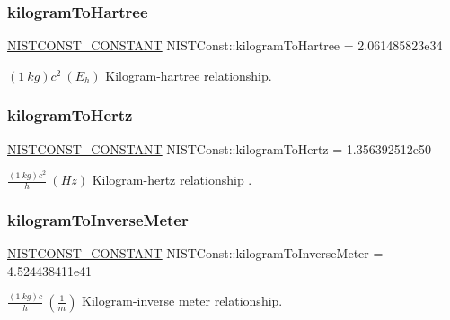 \subsubsection{\texorpdfstring{kilogram\+To\+Hartree}{kilogramToHartree}}
{\footnotesize\ttfamily \mbox{\hyperlink{group___n_i_s_t_const-_macros_ga2b0fc1d7452373f816175dd86ce26729}{N\+I\+S\+T\+C\+O\+N\+S\+T\+\_\+\+C\+O\+N\+S\+T\+A\+NT}} N\+I\+S\+T\+Const\+::kilogram\+To\+Hartree = 2.\+061485823e34}

$(1\ kg)c^2 \ (E_h)$ Kilogram-\/hartree relationship. \mbox{\label{group___n_i_s_t_const-_kilogram_ga325ee7a73343aa0c17859614e9c312bd}} 
\subsubsection{\texorpdfstring{kilogram\+To\+Hertz}{kilogramToHertz}}
{\footnotesize\ttfamily \mbox{\hyperlink{group___n_i_s_t_const-_macros_ga2b0fc1d7452373f816175dd86ce26729}{N\+I\+S\+T\+C\+O\+N\+S\+T\+\_\+\+C\+O\+N\+S\+T\+A\+NT}} N\+I\+S\+T\+Const\+::kilogram\+To\+Hertz = 1.\+356392512e50}

$\frac{(1\ kg)c^2}{h} \ (Hz)$ Kilogram-\/hertz relationship . \mbox{\label{group___n_i_s_t_const-_kilogram_gab05120ad69913df2e0ad5370c1d74d98}} 
\subsubsection{\texorpdfstring{kilogram\+To\+Inverse\+Meter}{kilogramToInverseMeter}}
{\footnotesize\ttfamily \mbox{\hyperlink{group___n_i_s_t_const-_macros_ga2b0fc1d7452373f816175dd86ce26729}{N\+I\+S\+T\+C\+O\+N\+S\+T\+\_\+\+C\+O\+N\+S\+T\+A\+NT}} N\+I\+S\+T\+Const\+::kilogram\+To\+Inverse\+Meter = 4.\+524438411e41}

$\frac{(1\ kg)c}{h} \ (\frac{1}{m})$ Kilogram-\/inverse meter relationship. \mbox{\label{group___n_i_s_t_const-_kilogram_ga68c270fa806d2f2704e80325a51962bb}} 
